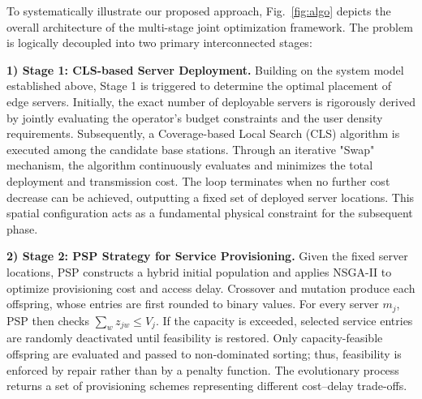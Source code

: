 \documentclass[10pt, conference, letterpaper]{IEEEtran}
\newenvironment{revision}{\begingroup\color{blue}}{\endgroup}
\newenvironment{revision}{\begingroup}{\endgroup}
\begin{document}
To systematically illustrate our proposed approach, Fig.~\ref{fig:algo} depicts the overall architecture of the multi-stage joint optimization framework. The problem is logically decoupled into two primary interconnected stages:

\textbf{1) Stage 1: CLS-based Server Deployment.} 
 Building on the system model established above, Stage 1 is triggered to determine the optimal placement of edge servers.
  Initially, the exact number of deployable servers is rigorously derived by jointly evaluating the operator's budget
  constraints and the user density requirements. Subsequently, a Coverage-based Local Search (CLS) algorithm is executed
  among the candidate base stations. Through an iterative "Swap" mechanism, the algorithm continuously evaluates and
  minimizes the total deployment and transmission cost. The loop terminates when no further cost decrease can be achieved,
  outputting a fixed set of deployed server locations. This spatial configuration acts as a fundamental physical constraint
  for the subsequent phase.

\begin{revision}
\textbf{2) Stage 2: PSP Strategy for Service Provisioning.}
Given the fixed server locations, PSP constructs a hybrid initial population and applies NSGA-II to optimize provisioning cost and access delay. Crossover and mutation produce each offspring, whose entries are first rounded to binary values. For every server $m_j$, PSP then checks $\sum_w z_{jw}\leq V_j$. If the capacity is exceeded, selected service entries are randomly deactivated until feasibility is restored. Only capacity-feasible offspring are evaluated and passed to non-dominated sorting; thus, feasibility is enforced by repair rather than by a penalty function. The evolutionary process returns a set of provisioning schemes representing different cost--delay trade-offs.
\end{revision}
\end{document}
